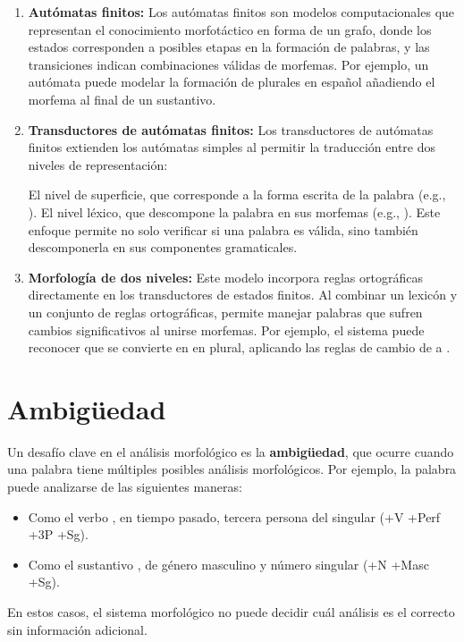 \documentclass{report}
\begin{document}
\begin{enumerate}
    \item {\textbf{Autómatas finitos:}}
    Los autómatas finitos son modelos computacionales que representan el conocimiento morfotáctico en forma de un grafo, donde los estados corresponden a posibles etapas en la formación de palabras, y las transiciones indican combinaciones válidas de morfemas. Por ejemplo, un autómata puede modelar la formación de plurales en español añadiendo el morfema  al final de un sustantivo. 

    \item{\textbf{Transductores de autómatas finitos:}}
    Los transductores de autómatas finitos extienden los autómatas simples al permitir la traducción entre dos niveles de representación:

    El nivel de superficie, que corresponde a la forma escrita de la palabra (e.g., ).
    El nivel léxico, que descompone la palabra en sus morfemas (e.g., ).
    Este enfoque permite no solo verificar si una palabra es válida, sino también descomponerla en sus componentes gramaticales.

    \item {\textbf{Morfología de dos niveles:}}
    Este modelo incorpora reglas ortográficas directamente en los transductores de estados finitos. Al combinar un lexicón y un conjunto de reglas ortográficas, permite manejar palabras que sufren cambios significativos al unirse morfemas. Por ejemplo, el sistema puede reconocer que  se convierte en  en plural, aplicando las reglas de cambio de  a .

\end{enumerate} 

\section{Ambigüedad}
Un desafío clave en el análisis morfológico es la \textbf{ambigüedad}, que ocurre cuando una palabra tiene múltiples posibles análisis morfológicos. Por ejemplo, la palabra  puede analizarse de las siguientes maneras:

\begin{itemize}
    \item Como el verbo \textbf{}, en tiempo pasado, tercera persona del singular (+V +Perf +3P +Sg).
    \item Como el sustantivo \textbf{}, de género masculino y número singular (+N +Masc +Sg).
\end{itemize}
En estos casos, el sistema morfológico no puede decidir cuál análisis es el correcto sin información adicional.
\end{document}
